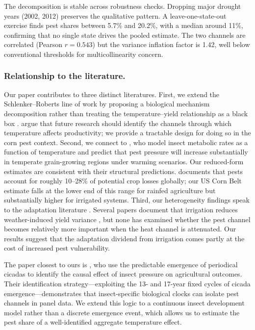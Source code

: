 \documentclass[12pt]{article}
\begin{document}
The decomposition is stable across robustness checks. Dropping major drought years (2002, 2012) preserves the qualitative pattern. A leave-one-state-out exercise finds pest shares between 5.7\% and 20.2\%, with a median around 11\%, confirming that no single state drives the pooled estimate. The two channels are correlated (Pearson $r = 0.543$) but the variance inflation factor is 1.42, well below conventional thresholds for multicollinearity concern.

\subsubsection*{Relationship to the literature.} Our paper contributes to three distinct literatures. First, we extend the Schlenker--Roberts line of work by proposing a biological mechanism decomposition rather than treating the temperature--yield relationship as a black box \citep{schlenker2009nonlinear, roberts2013identifying}. \citet{burke2017opportunities} argue that future research should identify the channels through which temperature affects productivity; we provide a tractable design for doing so in the corn pest context. Second, we connect to \citet{deutsch2018climate}, who model insect metabolic rates as a function of temperature and predict that pest pressure will increase substantially in temperate grain-growing regions under warming scenarios. Our reduced-form estimates are consistent with their structural predictions. \citet{oerke2006crop} documents that pests account for roughly 10--28\% of potential crop losses globally; our US Corn Belt estimate falls at the lower end of this range for rainfed agriculture but substantially higher for irrigated systems. Third, our heterogeneity findings speak to the adaptation literature \citep{lobell2014greater, fisher2012economic}. Several papers document that irrigation reduces weather-induced yield variance \citep{schlenker2005will, massetti2011irrigation}, but none has examined whether the pest channel becomes relatively more important when the heat channel is attenuated. Our results suggest that the adaptation dividend from irrigation comes partly at the cost of increased pest vulnerability.

The paper closest to ours is \citet{fletcher2024cicada}, who use the predictable emergence of periodical cicadas to identify the causal effect of insect pressure on agricultural outcomes. Their identification strategy---exploiting the 13- and 17-year fixed cycles of cicada emergence---demonstrates that insect-specific biological clocks can isolate pest channels in panel data. We extend this logic to a continuous insect development model rather than a discrete emergence event, which allows us to estimate the pest share of a well-identified aggregate temperature effect.
\end{document}
